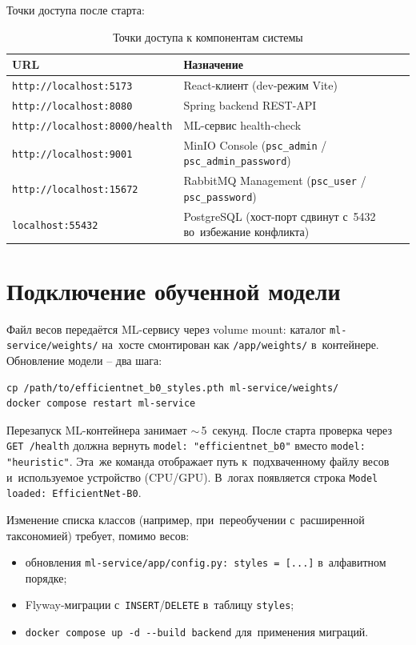 \documentclass[a4paper,12pt]{diplom}
\begin{document}
Точки доступа после старта:

\begin{table}[!ht]
\caption{Точки доступа к компонентам системы}
\label{tab:entry_points}
\centering
\begin{tabular}{lp{8cm}}
\toprule
\textbf{URL} & \textbf{Назначение} \\
\midrule
\verb|http://localhost:5173|     & React-клиент (dev-режим Vite) \\
\verb|http://localhost:8080|     & Spring backend REST-API \\
\verb|http://localhost:8000/health| & ML-сервис health-check \\
\verb|http://localhost:9001|     & MinIO Console (\verb|psc_admin| / \verb|psc_admin_password|) \\
\verb|http://localhost:15672|    & RabbitMQ Management (\verb|psc_user| / \verb|psc_password|) \\
\verb|localhost:55432|           & PostgreSQL (хост-порт сдвинут с~5432 во~избежание конфликта) \\
\bottomrule
\end{tabular}
\end{table}

\section{Подключение обученной модели}
\label{sec:weights_deploy}

Файл весов передаётся ML-сервису через volume mount: каталог \verb|ml-service/weights/| на~хосте смонтирован как \verb|/app/weights/| в~контейнере. Обновление модели -- два шага:

\begin{lstlisting}[basicstyle=\ttfamily\small,frame=single,caption={Обновление обученной модели},label=lst:update_weights]
cp /path/to/efficientnet_b0_styles.pth ml-service/weights/
docker compose restart ml-service
\end{lstlisting}

Перезапуск ML-контейнера занимает $\sim$\,5~секунд. После старта проверка через \verb|GET /health| должна вернуть \texttt{model: "efficientnet\_b0"} вместо \texttt{model: "heuristic"}. Эта~же команда отображает путь к~подхваченному файлу весов и~используемое устройство (CPU/GPU). В~логах появляется строка \verb|Model loaded: EfficientNet-B0|.

Изменение списка классов (например, при~переобучении с~расширенной таксономией) требует, помимо весов:
\begin{itemize}
\item обновления \verb|ml-service/app/config.py: styles = [...]| в~алфавитном порядке;
\item Flyway-миграции с~\texttt{INSERT}/\texttt{DELETE} в~таблицу \texttt{styles};
\item \verb|docker compose up -d --build backend| для~применения миграций.
\end{itemize}
\end{document}
